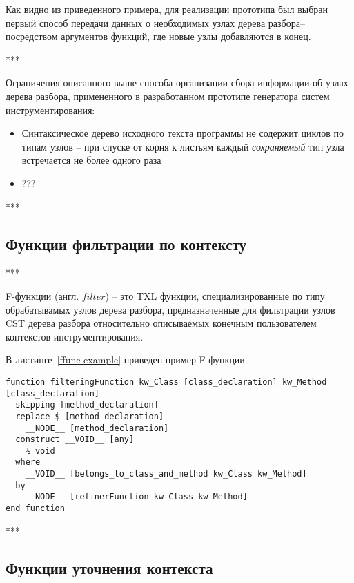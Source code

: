 Как видно из приведенного примера, для реализации прототипа был выбран первый способ передачи данных о необходимых узлах дерева разбора-- посредством аргументов функций, где новые узлы добавляются в конец.

***

Ограничения описанного выше способа организации сбора информации об узлах дерева разбора, примененного в разработанном прототипе генератора систем инструментирования:
\begin{itemize}[noitemsep]
  \item Синтаксическое дерево исходного текста программы не содержит циклов по типам узлов -- при спуске от корня к листьям каждый \textit{сохраняемый} тип узла встречается не более одного раза
  \item ???
\end{itemize}

***

\subsection{Функции фильтрации по контексту}

***

F-функции (англ. $filter$) -- это TXL функции, специализированные по типу обрабатывамых узлов дерева разбора, предназначенные для фильтрации узлов CST дерева разбора относительно описываемых конечным пользователем контекстов инструментирования.

В листинге~\ref{ffunc-example} приведен пример F-функции.

\begin{lstlisting}[language=TXL, label={ffunc-example}, caption={Пример F-функции}]
function filteringFunction kw_Class [class_declaration] kw_Method [class_declaration]
  skipping [method_declaration]
  replace $ [method_declaration]
    __NODE__ [method_declaration]
  construct __VOID__ [any]
    % void
  where
    __VOID__ [belongs_to_class_and_method kw_Class kw_Method]
  by
    __NODE__ [refinerFunction kw_Class kw_Method]
end function
\end{lstlisting}

***

\subsection{Функции уточнения контекста}

